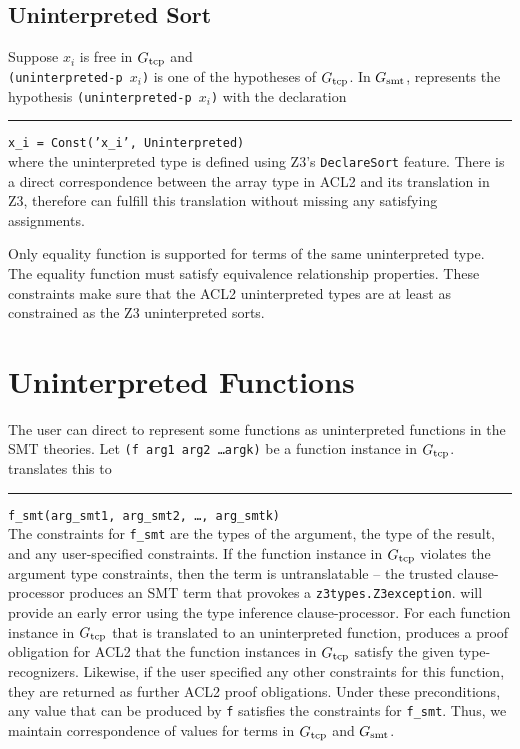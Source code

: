 \subsection{Uninterpreted Sort}\label{subsec:soundunintertype}
Suppose  $x_i$ is free in $G_{\mathrm{tcp}}$ and \\
\texttt{(uninterpreted-p $x_i$)} is one of
the hypotheses of $G_{\mathrm{tcp}}$. In $G_{\mathrm{smt}}$, \smtlink{} represents the hypothesis
\texttt{(uninterpreted-p $x_i$)} with the declaration\\
\rule{2em}{0ex}\texttt{x\_i = Const('x\_i', Uninterpreted)}\\
where the uninterpreted type is defined using Z3's \texttt{DeclareSort} feature.
There is a direct correspondence between the array type in ACL2 and its
translation in Z3, therefore \smtlink{} can fulfill this translation without
missing any satisfying assignments.

Only equality function is supported for terms of the same uninterpreted type.
The equality function must satisfy equivalence relationship properties. These
constraints make sure that the ACL2 uninterpreted types are at least as
constrained as the Z3 uninterpreted sorts.

\section{Uninterpreted Functions}\label{sec:sounduninterfun}
The user can direct \smtlink{} to represent some functions as uninterpreted
functions in the \acs{SMT} theories.
Let \texttt{(f arg1 arg2 \ldots argk)} be a function instance in $G_{\mathrm{tcp}}$.
\smtlink{} translates this to\\
\rule{2em}{0ex}\texttt{f\_smt(arg\_smt1, arg\_smt2, \ldots, arg\_smtk)}\\
The constraints for \texttt{f\_smt} are the types of the argument, the type of the
result, and any user-specified constraints.
If the function instance in $G_{\mathrm{tcp}}$ violates the argument type constraints, then
the term is untranslatable -- the trusted clause-processor produces an \acs{SMT}
term that provokes a \texttt{z3types.Z3exception}. \smtlink{} will provide an
early error using the type inference clause-processor.
For each function instance in $G_{\mathrm{tcp}}$ that is translated to an uninterpreted
function, \smtlink{} produces a proof obligation for ACL2 that the function
instances in $G_{\mathrm{tcp}}$ satisfy the given type-recognizers.
Likewise, if the user specified any other constraints for this function, they
are returned as further ACL2 proof obligations.
Under these preconditions, any value that can be produced by \texttt{f}
satisfies the constraints for \texttt{f\_smt}.
Thus, we maintain correspondence of values for terms in $G_{\mathrm{tcp}}$ and $G_{\mathrm{smt}}$.

